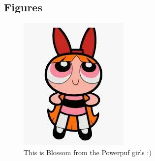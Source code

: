 \documentclass{article}
\begin{document}
\subsection{Figures}

\begin{figure}
    \centering
    \includegraphics{BLOSSOM .jpg}
    \caption{This is Blossom from the Powerpuf girls :)}
    \label{BLOSSOM}
\end{figure}
   
\end{document}
